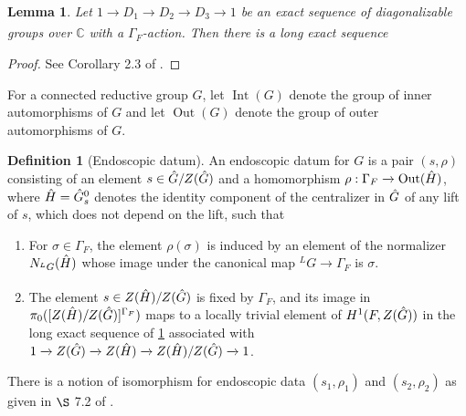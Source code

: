 \documentclass[11pt,a4paper]{article}
\theoremstyle{definition}
\newtheorem{D}[shared]{Definition}
\theoremstyle{plain}
\newtheorem{Le}[shared]{Lemma}
\theoremstyle{remark}
\theoremstyle{plain}
\DeclareMathOperator{\Out}{Out}
\DeclareMathOperator{\Int}{Int}
\begin{document}
\begin{Le}\label{keylemmaendo}
    Let $1 \xrightarrow[]{} D_1 \xrightarrow[]{} D_2 \xrightarrow[]{} D_3 \xrightarrow[]{} 1$ be an exact sequence of diagonalizable groups over $\mathbb{C}$ with a $\Gamma_F$-action. Then there is a long exact sequence
\begin{center}
\end{center}
\end{Le}
\begin{proof}
    See Corollary 2.3 of \cite{MR0757954}.
\end{proof}

For a connected reductive group $G$, let $\Int(G)$ denote the group of inner automorphisms of $G$ and let $\Out(G)$ denote the group of outer automorphisms of $G$.

\begin{D}[Endoscopic datum]\label{endodef}
    An endoscopic datum for $G$ is a pair $(s, \rho)$ consisting of an element $s \in \Hat{G}/Z(\Hat{G})$ and a homomorphism $\rho: \Gamma_F \xrightarrow[]{} \Out(\Hat{H})$, where $\Hat{H} = \Hat{G}_s^0$ denotes the identity component of the centralizer in $\Hat{G}$ of any lift of $s$, which does not depend on the lift, such that
    \begin{enumerate}
        \item For $\sigma \in \Gamma_F$, the element $\rho(\sigma)$ is induced by an element of the normalizer $N_{{}^L G}(\Hat{H})$ whose image under the canonical map ${}^L G \xrightarrow[]{} \Gamma_F$ is $\sigma$.
        \item The element $s \in Z(\Hat{H})/Z(\Hat{G})$ is fixed by $\Gamma_F$, and its image in $\pi_0([Z(\Hat{H})/Z(\Hat{G})]^{\Gamma_F})$ maps to a locally trivial element of $H^1(F, Z(\Hat{G}))$ in the long exact sequence of \ref{keylemmaendo} associated with $1 \xrightarrow[]{} Z(\Hat{G}) \xrightarrow[]{} Z(\Hat{H}) \xrightarrow[]{} Z(\Hat{H}) / Z(\Hat{G}) \xrightarrow[]{} 1$.
    \end{enumerate}
    There is a notion of isomorphism for endoscopic data $(s_1, \rho_1)$ and $(s_2, \rho_2)$ as given in $\S$ 7.2 of \cite{MR0757954}.
\end{D}
\end{document}
